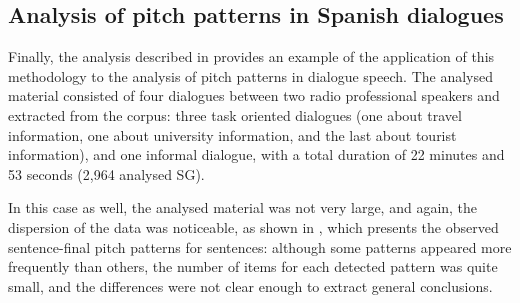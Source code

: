 \documentclass[output=paper]{langsci/langscibook}
\begin{document}
\begin{table}[p]

\caption{Most frequent patterns appearing in sentence-final position (\citealt{GarridoRustullet2011}). The ``ENUNCIATIVA'' label indicates that patterns appear in declarative sentences.}
\label{tab:gar:14}
\end{table}\clearpage

\subsection{Analysis of pitch patterns in Spanish dialogues}

Finally, the analysis described in \citet{GarridoRustullet2011} provides an example of the application of this methodology to the analysis of pitch patterns in  dialogue speech. The analysed material consisted of four dialogues between two radio professional speakers and extracted from the  corpus: three task oriented dialogues (one about travel information, one about university information, and the last about tourist information), and one informal dialogue, with a total duration of 22 minutes and 53 seconds (2,964 analysed SG). 


In this case as well, the analysed material was not very large, and again, the dispersion of the data was noticeable, as shown in , which presents the observed sentence-final pitch patterns for  sentences: although some patterns appeared more frequently than others, the number of items for each detected pattern was quite small, and the differences were not clear enough to extract general conclusions.
\end{document}
